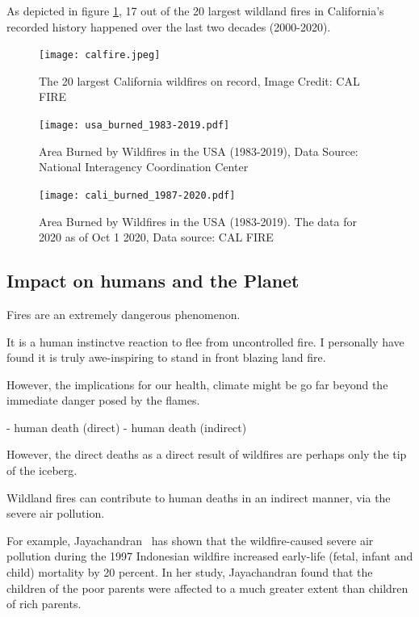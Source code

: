   As depicted in figure \ref{fig:caltop20}, 17 out of the 20 largest wildland fires in California's recorded history happened over the last two decades (2000-2020).


  \begin{figure}\label{fig:caltop20}
    \texttt{[image: calfire.jpeg]}
    \caption{The 20 largest California wildfires on record, Image Credit: CAL FIRE\cite{calfire}}
  \end{figure}

  \begin{figure}
    \texttt{[image: usa\_burned\_1983-2019.pdf]}
    \caption{Area Burned by Wildfires in the USA (1983-2019), Data Source: National Interagency Coordination Center\cite{NICI}}
  \end{figure}

  \begin{figure}
    \texttt{[image: cali\_burned\_1987-2020.pdf]}
    \caption{Area Burned by Wildfires in the USA (1983-2019). The data for 2020 as of Oct 1 2020, Data source: CAL FIRE\cite{calfire}}
  \end{figure}



  \subsection{Impact on humans and the Planet}

  Fires are an extremely dangerous phenomenon. 
  
  It is a human instinctve reaction to flee from uncontrolled fire.
  I personally have found it is truly awe-inspiring to stand in front blazing land fire.

  However, the implications for our health, climate might be 
  go far beyond the immediate danger posed by the flames.

  
  - human death (direct)
  - human death (indirect) %
  
  However, the direct deaths as a direct result of wildfires are perhaps only the tip of the iceberg.
  
  Wildland fires can contribute to human deaths in an indirect manner, via the severe air pollution.

  For example, Jayachandran~\cite{Jayachandran2009} has shown that the wildfire-caused severe air pollution during the 
  1997 Indonesian wildfire increased early-life (fetal, infant and child) mortality by 20 percent.
  In her study, Jayachandran found that the children of the poor parents were affected to a much greater extent than children of rich parents. %




